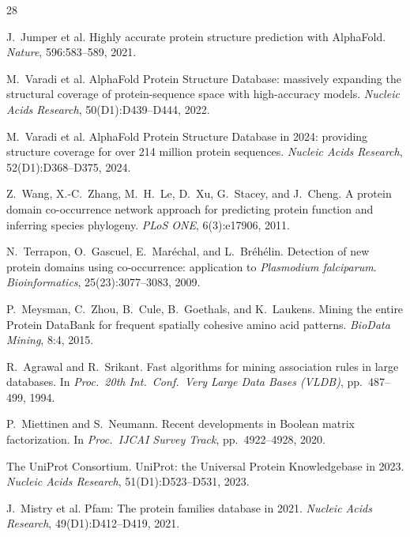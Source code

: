\documentclass[10pt,a4paper,twocolumn]{article}
\begin{document}
\begin{thebibliography}{28}

J.~Jumper et al.
\newblock Highly accurate protein structure prediction with AlphaFold.
\newblock \emph{Nature}, 596:583--589, 2021.

M.~Varadi et al.
\newblock AlphaFold Protein Structure Database: massively expanding the structural coverage of protein-sequence space with high-accuracy models.
\newblock \emph{Nucleic Acids Research}, 50(D1):D439--D444, 2022.

M.~Varadi et al.
\newblock AlphaFold Protein Structure Database in 2024: providing structure coverage for over 214 million protein sequences.
\newblock \emph{Nucleic Acids Research}, 52(D1):D368--D375, 2024.

Z.~Wang, X.-C.~Zhang, M.~H.~Le, D.~Xu, G.~Stacey, and J.~Cheng.
\newblock A protein domain co-occurrence network approach for predicting protein function and inferring species phylogeny.
\newblock \emph{PLoS ONE}, 6(3):e17906, 2011.

N.~Terrapon, O.~Gascuel, E.~Mar\'echal, and L.~Br\'eh\'elin.
\newblock Detection of new protein domains using co-occurrence: application to \emph{Plasmodium falciparum}.
\newblock \emph{Bioinformatics}, 25(23):3077--3083, 2009.

P.~Meysman, C.~Zhou, B.~Cule, B.~Goethals, and K.~Laukens.
\newblock Mining the entire Protein DataBank for frequent spatially cohesive amino acid patterns.
\newblock \emph{BioData Mining}, 8:4, 2015.

R.~Agrawal and R.~Srikant.
\newblock Fast algorithms for mining association rules in large databases.
\newblock In \emph{Proc.\ 20th Int.\ Conf.\ Very Large Data Bases (VLDB)}, pp.\ 487--499, 1994.

P.~Miettinen and S.~Neumann.
\newblock Recent developments in Boolean matrix factorization.
\newblock In \emph{Proc.\ IJCAI Survey Track}, pp.\ 4922--4928, 2020.

The UniProt Consortium.
\newblock UniProt: the Universal Protein Knowledgebase in 2023.
\newblock \emph{Nucleic Acids Research}, 51(D1):D523--D531, 2023.

J.~Mistry et al.
\newblock Pfam: The protein families database in 2021.
\newblock \emph{Nucleic Acids Research}, 49(D1):D412--D419, 2021.


\end{thebibliography}
\end{document}
